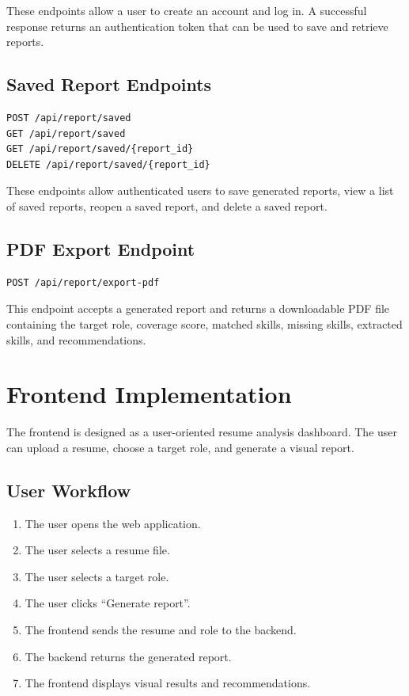 \documentclass[12pt,a4paper]{article}
\begin{document}
These endpoints allow a user to create an account and log in. A successful response returns an authentication token that can be used to save and retrieve reports.

\subsection{Saved Report Endpoints}

\begin{lstlisting}
POST /api/report/saved
GET /api/report/saved
GET /api/report/saved/{report_id}
DELETE /api/report/saved/{report_id}
\end{lstlisting}

These endpoints allow authenticated users to save generated reports, view a list of saved reports, reopen a saved report, and delete a saved report.

\subsection{PDF Export Endpoint}

\begin{lstlisting}
POST /api/report/export-pdf
\end{lstlisting}

This endpoint accepts a generated report and returns a downloadable PDF file containing the target role, coverage score, matched skills, missing skills, extracted skills, and recommendations.

\section{Frontend Implementation}

The frontend is designed as a user-oriented resume analysis dashboard. The user can upload a resume, choose a target role, and generate a visual report.

\subsection{User Workflow}

\begin{enumerate}
    \item The user opens the web application.
    \item The user selects a resume file.
    \item The user selects a target role.
    \item The user clicks ``Generate report''.
    \item The frontend sends the resume and role to the backend.
    \item The backend returns the generated report.
    \item The frontend displays visual results and recommendations.
\end{enumerate}
\end{document}
